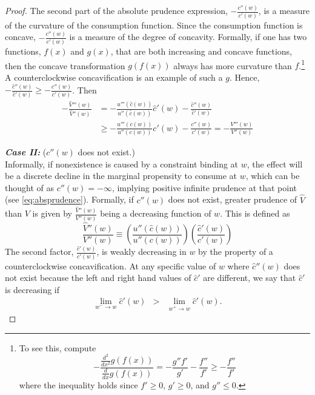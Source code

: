 \documentclass[titlepage]{\econtex}
\begin{document}
\begin{proof}
    The second part of the absolute prudence expression, $-\frac{c''(w)}{c'(w)}$, is a measure of the curvature of the consumption function. Since the consumption function is concave, $-\frac{c''(w)}{c'(w)}$ is a measure of the degree of concavity. Formally, if one has two functions, $f(x)$ and $g(x)$, that are both increasing and concave functions, then the concave transformation $g(f(x))$ always has more curvature than $f$.\footnote{To see this, compute \[-\frac{\frac{d^2}{dx^2} g(f(x))}{\frac{d}{dx}g(f(x))} = - \frac{g''f'}{g'} - \frac{f''}{f'} \geq - \frac{f''}{f'}\] where the inequality holds since $f' \geq 0$, $g' \geq 0$, and $g'' \leq 0$.} A counterclockwise concavification is an example of such a $g$. Hence, $-\frac{\hat{c}''(w)}{\hat{c}'(w)} \geq -\frac{c''(w)}{c'(w)}$. Then
    \begin{align*}
      -\frac{\hat{V}'''(w)}{\hat{V}''(w)} &= -\frac{u'''(\hat{c}(w))}{u''(\hat{c}(w))}\hat{c}'(w) - \frac{\hat{c}''(w)}{\hat{c}'(w)} \\ 
                                          &\geq -\frac{u'''(c(w))}{u''(c(w))}c'(w) - \frac{c''(w)}{c'(w)} = -\frac{V'''(w)}{V''(w)}
    \end{align*}
    
    \bigskip
    \noindent \textbf{\textit{Case II:}} ($c''(w)$ does not exist.)\\
    Informally, if nonexistence is caused by a constraint binding at $w$, the effect will be a discrete decline in the marginal propensity to consume at $w$, which can be thought of as $c''(w) = -\infty$, implying positive infinite prudence at that point (see \eqref{eq:absprudence}). Formally, if $c''(w)$ does not exist, greater prudence of $\hat{V}$ than $V$ is given by $\frac{\hat{V}''(w)}{V''(w)}$ being a decreasing function of $w$. This is defined as
    \[\frac{\hat{V}''(w)}{V''(w)} \equiv 
      \left(\frac{u''(\hat c(w))}{u''(c(w))} \right)
      \left(\frac{\hat{c}'(w)}{c'(w)}\right)\]
    The second factor, $\frac{\hat{c}'(w)}{c'(w)}$, is weakly decreasing in $w$ by the property of a counterclockwise concavification. At any specific value of $w$ where
    $\hat{c}''(w)$ does not exist because the left and right hand
    values of $\hat{c}'$ are different, we say that $\hat{c}'$
    is decreasing if
    \begin{eqnarray}
      \lim_{w^{-} \rightarrow w} \hat{c}'(w) & > & \lim_{w^{+} \rightarrow w} \hat{c}'(w).
    \end{eqnarray}
    

\end{proof}
\end{document}
